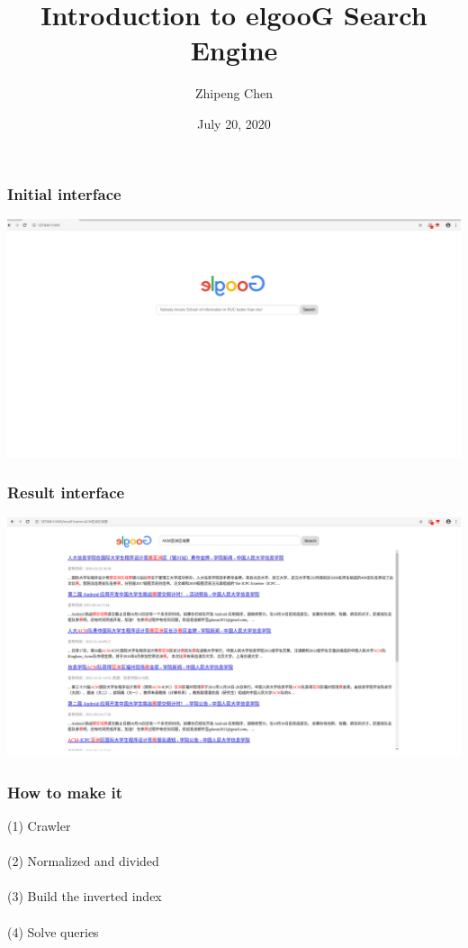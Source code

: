 \documentclass{beamer}
\title{Introduction to elgooG Search Engine}
\author{Zhipeng Chen}
\date{July 20, 2020}
\begin{document}
\maketitle

\begin{frame}
	\frametitle{Initial interface}
	\begin{center}
		\includegraphics[width=1\textwidth, height=0.6\textheight]{UI-1.png}
	\end{center}
	
\end{frame}

\begin{frame}
	\frametitle{Result interface}
	\begin{center}
		\includegraphics[width=1\textwidth, height=0.6\textheight]{UI-2.png}
	\end{center}
\end{frame}

\begin{frame}
	\frametitle{How to make it}
	(1) Crawler
	\\ \hspace*{\fill} \\
	(2) Normalized and divided
	\\ \hspace*{\fill} \\
	(3) Build the inverted index
	\\ \hspace*{\fill} \\
	(4) Solve queries

\end{frame}
\end{document}
